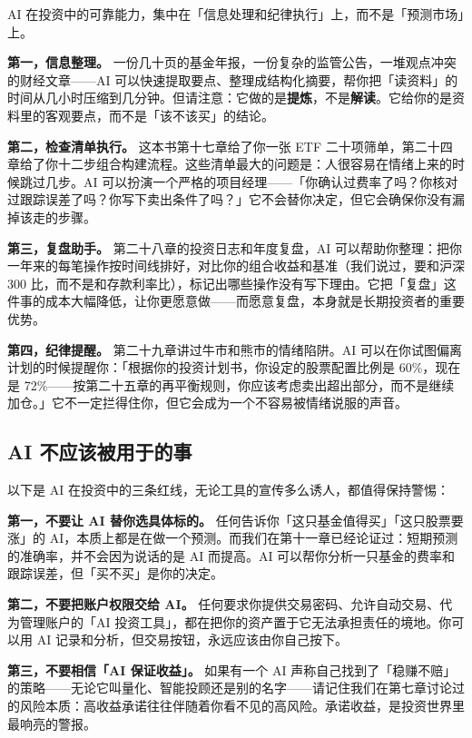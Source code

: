 \documentclass[a4paper,11pt,oneside,fontset=none,UTF8,zihao=-4]{ctexbook}
\begin{document}
AI
在投资中的可靠能力，集中在「信息处理和纪律执行」上，而不是「预测市场」上。

\textbf{第一，信息整理。}
一份几十页的基金年报，一份复杂的监管公告，一堆观点冲突的财经文章------AI
可以快速提取要点、整理成结构化摘要，帮你把「读资料」的时间从几小时压缩到几分钟。但请注意：它做的是\textbf{提炼}，不是\textbf{解读}。它给你的是资料里的客观要点，而不是「该不该买」的结论。

\textbf{第二，检查清单执行。} 这本书第十七章给了你一张 ETF
二十项筛单，第二十四章给了你十二步组合构建流程。这些清单最大的问题是：人很容易在情绪上来的时候跳过几步。AI
可以扮演一个严格的项目经理------「你确认过费率了吗？你核对过跟踪误差了吗？你写下卖出条件了吗？」它不会替你决定，但它会确保你没有漏掉该走的步骤。

\textbf{第三，复盘助手。} 第二十八章的投资日志和年度复盘，AI
可以帮助你整理：把你一年来的每笔操作按时间线排好，对比你的组合收益和基准（我们说过，要和沪深
300
比，而不是和存款利率比），标记出哪些操作没有写下理由。它把「复盘」这件事的成本大幅降低，让你更愿意做------而愿意复盘，本身就是长期投资者的重要优势。

\textbf{第四，纪律提醒。} 第二十九章讲过牛市和熊市的情绪陷阱。AI
可以在你试图偏离计划的时候提醒你：「根据你的投资计划书，你设定的股票配置比例是
60\%，现在是
72\%------按第二十五章的再平衡规则，你应该考虑卖出超出部分，而不是继续加仓。」它不一定拦得住你，但它会成为一个不容易被情绪说服的声音。

\subsection{AI
不应该被用于的事}\label{ai-ux4e0dux5e94ux8be5ux88abux7528ux4e8eux7684ux4e8b}

以下是 AI 在投资中的三条红线，无论工具的宣传多么诱人，都值得保持警惕：

\textbf{第一，不要让 AI 替你选具体标的。}
任何告诉你「这只基金值得买」「这只股票要涨」的
AI，本质上都是在做一个预测。而我们在第十一章已经论证过：短期预测的准确率，并不会因为说话的是
AI 而提高。AI
可以帮你分析一只基金的费率和跟踪误差，但「买不买」是你的决定。

\textbf{第二，不要把账户权限交给 AI。}
任何要求你提供交易密码、允许自动交易、代为管理账户的「AI
投资工具」，都在把你的资产置于它无法承担责任的境地。你可以用 AI
记录和分析，但交易按钮，永远应该由你自己按下。

\textbf{第三，不要相信「AI 保证收益」。} 如果有一个 AI
声称自己找到了「稳赚不赔」的策略------无论它叫量化、智能投顾还是别的名字------请记住我们在第七章讨论过的风险本质：高收益承诺往往伴随着你看不见的高风险。承诺收益，是投资世界里最响亮的警报。
\end{document}
